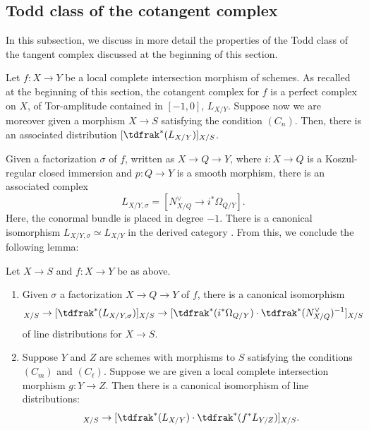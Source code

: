 \subsection{Todd class of the cotangent complex }\label{subsubsec:td-class-tangent}
In this subsection, we discuss in more detail the properties of the Todd class of the tangent complex discussed at the beginning of this section.

Let $f: X\to Y$ be a local complete intersection morphism of schemes. As recalled at the beginning of this section, the cotangent complex for $f$ is a perfect complex on $X$, of Tor-amplitude contained in $[-1,0]$, $L_{X/Y}$. Suppose now we are moreover given a morphism $X \to S$ satisfying the condition $(C_n)$. Then, there is an associated distribution $[\tdfrak^*(L_{X/Y})]_{X/S}$.

Given a factorization $\sigma$ of $f$, written as $X\to Q\to Y$, where $i\colon X\to Q$ is a Koszul-regular closed immersion and $p\colon Q \to Y$ is a smooth morphism, there is an associated complex
\begin{equation}\label{eq:cotangent}
L_{X/Y, \sigma} = [N_{X/Q}^\vee \to i^* \Omega_{Q/Y}].
\end{equation}
Here, the conormal bundle is placed in degree $-1$. There is a canonical isomorphism $L_{X/Y, \sigma}\simeq L_{X/Y}$ in the derived category \cite[\href{https://stacks.math.columbia.edu/tag/0FV4}{0FV4}]{stacks-project}. From this, we conclude the following lemma:

\begin{lemma}\label{lemma:td-factorisation-independence}
Let $X \to S$ and $f\colon X\to Y$ be as above.
\begin{enumerate}
\item Given $\sigma$ a factorization $X\to Q\to Y$ of $f$, there is a canonical isomorphism
\begin{displaymath}
[\tdfrak^*(L_{X/Y})]_{X/S} \to [\tdfrak^*(L_{X/Y,\sigma})]_{X/S} \to [\tdfrak^*(i^\ast \Omega_{Q/Y}) \cdot \tdfrak^*(N^\vee_{X/Q})^{-1}]_{X/S}
\end{displaymath}
of line distributions for $X\to S$.
\item Suppose $Y$ and $Z$ are schemes with morphisms to $S$ satisfying the conditions $(C_m)$ and $(C_{\ell})$. Suppose we are given a local complete intersection morphism \hbox{$g \colon Y\to Z$}. Then there is a canonical isomorphism of line distributions:
\begin{displaymath}
[\tdfrak^*(L_{X/Z})]_{X/S} \to [\tdfrak^*(L_{X/Y}) \cdot \tdfrak^* (f^\ast L_{Y/Z})]_{X/S}.
\end{displaymath}
\end{enumerate}
\end{lemma}


